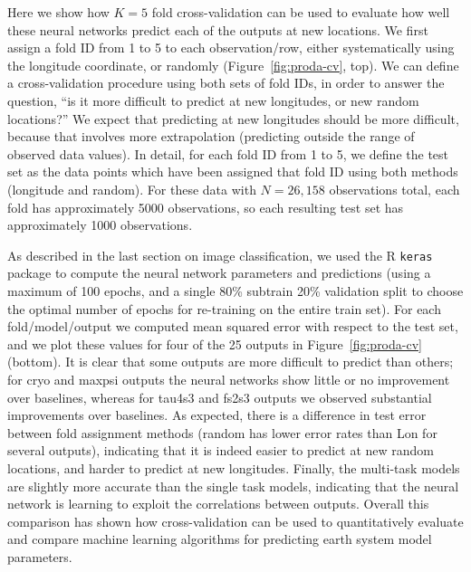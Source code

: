 \documentclass[12pt]{article}
\begin{document}
Here we show how $K=5$ fold cross-validation can be used to evaluate
how well these neural networks predict each of the outputs at new
locations. We first assign a fold ID from 1 to 5 to each
observation/row, either systematically using the longitude coordinate,
or randomly (Figure~\ref{fig:proda-cv}, top). We can define a
cross-validation procedure using both sets of fold IDs, in order to
answer the question, ``is it more difficult to predict at new
longitudes, or new random locations?'' We expect that predicting at
new longitudes should be more difficult, because that involves more
extrapolation (predicting outside the range of observed data
values). In detail, for each fold ID from 1 to 5, we define the test
set as the data points which have been assigned that fold ID using
both methods (longitude and random). For these data with $N=26,158$
observations total, each fold has approximately 5000 observations,
so each resulting test set has approximately 1000 observations.

As described in the last section on image classification, we used the
R \texttt{keras} package to compute the neural network parameters and
predictions (using a maximum of 100 epochs, and a single 80\% subtrain
20\% validation split to choose the optimal number of epochs for
re-training on the entire train set). For each fold/model/output we
computed mean squared error with respect to the test set, and we plot
these values for four of the 25 outputs in Figure~\ref{fig:proda-cv}
(bottom). It is clear that some outputs are more difficult to predict
than others; for cryo and maxpsi outputs the neural networks show
little or no improvement over baselines, whereas for tau4s3 and fs2s3
outputs we observed substantial improvements over baselines. As
expected, there is a difference in test error between fold assignment
methods (random has lower error rates than Lon for several outputs),
indicating that it is indeed easier to predict at new random
locations, and harder to predict at new longitudes. Finally, the
multi-task models are slightly more accurate than the single task
models, indicating that the neural network is learning to exploit the
correlations between outputs. Overall this comparison has shown how
cross-validation can be used to quantitatively evaluate and compare
machine learning algorithms for predicting earth system model 
parameters.
\end{document}
